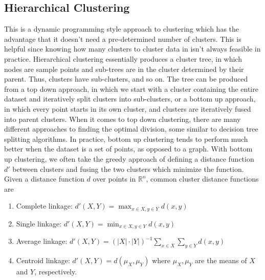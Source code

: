 \documentclass{article}
\begin{document}
\subsection{Hierarchical Clustering}
This is a dynamic programming style approach to clustering which has the advantage that it doesn't need a pre-determined number of clusters. This is helpful since knowing how many clusters to cluster data in isn't always feasible in practice. Hierarchical clustering essentially produces a cluster tree, in which nodes are sample points and sub-trees are in the cluster determined by their parent. Thus, clusters have sub-clusters, and so on. The tree can be produced from a top down approach, in which we start with a cluster containing the entire dataset and iteratively split clusters into sub-clusters, or a bottom up approach, in which every point starts in its own cluster, and clusters are iteratively fused into parent clusters.
\newline \newline
When it comes to top down clustering, there are many different approaches to finding the optimal division, some similar to decision tree splitting algorithms. In practice, bottom up clustering tends to perform much better when the dataset is a set of points, as opposed to a graph. With bottom up clustering, we often take the greedy approach of defining a distance function $ d' $ between clusters and fusing the two clusters which minimize the function. Given a distance function $ d $ over points in $ \mathbb{R}^n $, common cluster distance functions are
\begin{enumerate}
    \item Complete linkage: $ d'(X, Y) = \max_{x \in X, y \in Y} d(x, y) $
    \item Single linkage: $ d'(X, Y) = \min_{x \in X, y \in Y} d(x, y) $
    \item Average linkage: $ d'(X, Y) = (| X | \cdot | Y |)^{-1} \sum_{x \in X} \sum_{y \in Y} d(x, y) $
    \item Centroid linkage: $ d'(X, Y) = d(\mu_X, \mu_Y) $ where $ \mu_X, \mu_Y $ are the means of $ X $ and $ Y $, respectively.
\end{enumerate}
\end{document}

